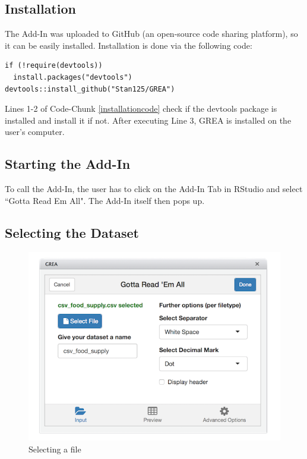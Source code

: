 \documentclass[12pt]{article} %
\begin{document}
\subsection{Installation}
The Add-In was uploaded to GitHub (an open-source code sharing platform), so it can be easily installed. Installation is done via the following code: 
\begin{lstlisting}[caption = Installation of GREA, label = installationcode]
if (!require(devtools))
  install.packages("devtools")
devtools::install_github("Stan125/GREA")
\end{lstlisting}

Lines 1-2 of Code-Chunk \ref{installationcode} check if the devtools package is installed and install it if not. After executing Line 3, GREA is installed on the user's computer.

\subsection{Starting the Add-In}

To call the Add-In, the user has to click on the Add-In Tab in RStudio and select ``Gotta Read Em All". The Add-In itself then pops up.

\subsection{Selecting the Dataset}

\begin{figure}
\center
\includegraphics[scale = 0.7]{figures/step1.png}
\caption{Selecting a file}
\label{stepone}
\end{figure}
\end{document}
